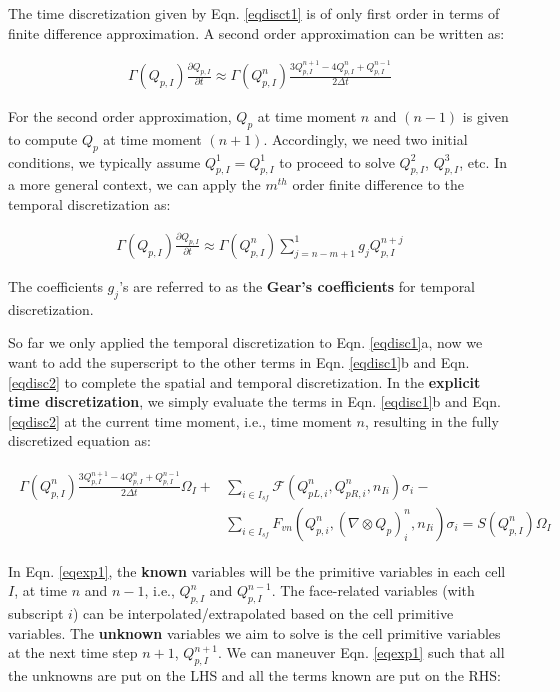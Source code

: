 \documentclass[12pt, letterpaper]{report}
\begin{document}
The time discretization given by Eqn. \ref{eqdisct1} is of only first order in terms of finite
difference approximation. A second order approximation can be written as:

\begin{align}\label{eqdisct2}
   \Gamma(Q_{p,I})\frac{\partial Q_{p,I}}{\partial t} \approx \Gamma(Q_{p,I}^n) \frac{3Q_{p,I}^{n+1} -
   4Q_{p,I}^n + Q_{p,I}^{n-1}}{2\Delta t}
\end{align}

For the second order approximation, $Q_p$ at time moment $n$ and $(n-1)$ is given to compute $Q_p$
at time moment $(n+1)$. Accordingly, we need two initial conditions, we typically assume $Q_{p,I}^1
= Q_{p,I}^1$ to proceed to solve $Q_{p,I}^2$, $Q_{p,I}^3$, etc. In a more general context, we can
apply the $m^{th}$ order finite difference to the temporal discretization as:

\begin{align*}
   \Gamma(Q_{p,I})\frac{\partial Q_{p,I}}{\partial t} \approx \Gamma(Q_{p,I}^n) \sum_{j=n-m+1}^{1}
   g_j Q_{p,I}^{n+j}
\end{align*}

The coefficients $g_j$'s are referred to as the {\bf Gear's coefficients} for temporal
discretization. \paraspace

So far we only applied the temporal discretization to Eqn. \ref{eqdisc1}a, now we want to add the
superscript to the other terms in Eqn. \ref{eqdisc1}b and Eqn. \ref{eqdisc2} to complete the
spatial and temporal discretization. In the {\bf explicit time discretization}, we simply evaluate the
terms in Eqn. \ref{eqdisc1}b and Eqn. \ref{eqdisc2} at the current time moment, i.e., time moment
$n$, resulting in the fully discretized equation as:

\begin{align}\label{eqexp1}
   \begin{split}
      \Gamma(Q_{p,I}^n) \frac{3Q_{p,I}^{n+1} - 4Q_{p,I}^n + Q_{p,I}^{n-1}}{2\Delta t} \Omega_I +
      &\sum_{i \in I_{sf}} \mathcal{F}(Q_{pL,i}^n, Q_{pR,i}^n, n_{Ii}) \sigma_i - \\ &\sum_{i \in
      I_{sf}} F_{vn}(Q_{p,i}^n, (\nabla \mathop{\otimes} Q_p)_i^n, n_{Ii}) \sigma_i = S(Q_{p,I}^n)
      \Omega_I
   \end{split}
\end{align}

In Eqn. \ref{eqexp1}, the {\bf known} variables will be the primitive variables in each cell $I$,
at time $n$ and $n-1$, i.e., $Q_{p,I}^n$ and $Q_{p,I}^{n-1}$. The face-related variables (with
subscript $i$) can be interpolated/extrapolated based on the cell primitive variables. The {\bf
unknown} variables we aim to solve is the cell primitive variables at the next time step $n+1$,
$Q_{p,I}^{n+1}$. We can maneuver Eqn. \ref{eqexp1} such that all the unknowns are put on the LHS and
all the terms known are put on the RHS:
\end{document}
